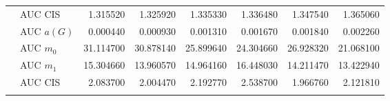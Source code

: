 \begin{table}[htbp]
\begin{tabular}{llrrrrrr}
    & AUC CIS & 1.315520 & 1.325920 & 1.335330 & 1.336480 & 1.347540 & 1.365060 \\
    \addlinespace
    \multirow{4}{*}{random} & AUC $a(G)$ & 0.000440 & 0.000930 & 0.001310 & 0.001670 & 0.001840 & 0.002260 \\
    & AUC $m_0$ & 31.114700 & 30.878140 & 25.899640 & 24.304660 & 26.928320 & 21.068100 \\
    & AUC $m_1$ & 15.304660 & 13.960570 & 14.964160 & 16.448030 & 14.211470 & 13.422940 \\
    & AUC CIS & 2.083700 & 2.004470 & 2.192770 & 2.538700 & 1.966760 & 2.121810 \\
    \addlinespace
    \bottomrule
  \end{tabular}
\end{table}


